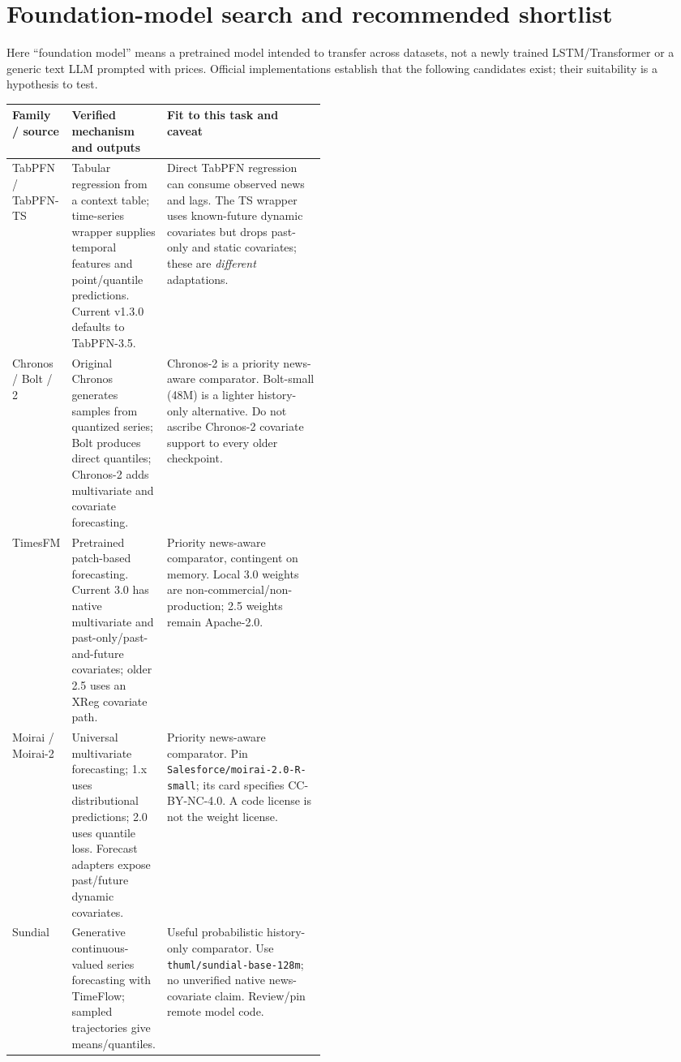 \documentclass[11pt,letterpaper]{article}
\begin{document}
\section{Foundation-model search and recommended shortlist}
Here ``foundation model'' means a pretrained model intended to transfer across datasets, not a newly trained LSTM/Transformer or a generic text LLM prompted with prices. Official implementations establish that the following candidates exist; their suitability is a hypothesis to test.

\begin{table}[htbp]
\centering\footnotesize
\begin{tabularx}{\linewidth}{@{}P{0.17\linewidth}P{0.28\linewidth}Y@{}}
\toprule
Family / source & Verified mechanism and outputs & Fit to this task and caveat \\
\midrule
TabPFN / TabPFN-TS \cite{tabpfn} & Tabular regression from a context table; time-series wrapper supplies temporal features and point/quantile predictions. Current v1.3.0 defaults to TabPFN-3.5. & Direct TabPFN regression can consume observed news and lags. The TS wrapper uses known-future dynamic covariates but drops past-only and static covariates; these are \emph{different} adaptations. \\
Chronos / Bolt / 2 \cite{chronos} & Original Chronos generates samples from quantized series; Bolt produces direct quantiles; Chronos-2 adds multivariate and covariate forecasting. & Chronos-2 is a priority news-aware comparator. Bolt-small (48M) is a lighter history-only alternative. Do not ascribe Chronos-2 covariate support to every older checkpoint. \\
TimesFM \cite{timesfm} & Pretrained patch-based forecasting. Current 3.0 has native multivariate and past-only/past-and-future covariates; older 2.5 uses an XReg covariate path. & Priority news-aware comparator, contingent on memory. Local 3.0 weights are non-commercial/non-production; 2.5 weights remain Apache-2.0. \\
Moirai / Moirai-2 \cite{moirai} & Universal multivariate forecasting; 1.x uses distributional predictions; 2.0 uses quantile loss. Forecast adapters expose past/future dynamic covariates. & Priority news-aware comparator. Pin \texttt{Salesforce/moirai-2.0-R-small}; its card specifies CC-BY-NC-4.0. A code license is not the weight license. \\
Sundial \cite{sundial} & Generative continuous-valued series forecasting with TimeFlow; sampled trajectories give means/quantiles. & Useful probabilistic history-only comparator. Use \texttt{thuml/sundial-base-128m}; no unverified native news-covariate claim. Review/pin remote model code. \\

\end{tabularx}
\end{table}
\end{document}

